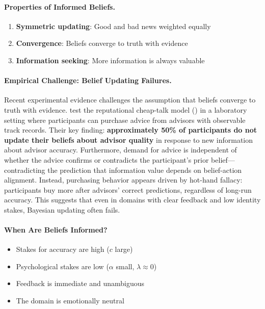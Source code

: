 \paragraph{Properties of Informed Beliefs.}
\begin{enumerate}
\item \textbf{Symmetric updating}: Good and bad news weighted equally
\item \textbf{Convergence}: Beliefs converge to truth with evidence
\item \textbf{Information seeking}: More information is always valuable
\end{enumerate}

\paragraph{Empirical Challenge: Belief Updating Failures.}
Recent experimental evidence challenges the assumption that beliefs converge to
truth with evidence. \citet{bregolin2026advice} test the reputational cheap-talk
model (\citealt{sobel1985theory}) in a laboratory setting where participants can
purchase advice from advisors with observable track records. Their key finding:
\textbf{approximately 50\% of participants do not update their beliefs about
advisor quality} in response to new information about advisor accuracy.
Furthermore, demand for advice is independent of whether the advice confirms or
contradicts the participant's prior belief---contradicting the prediction that
information value depends on belief-action alignment. Instead, purchasing behavior
appears driven by hot-hand fallacy: participants buy more after advisors' correct
predictions, regardless of long-run accuracy. This suggests that even in domains
with clear feedback and low identity stakes, Bayesian updating often fails.

\paragraph{When Are Beliefs Informed?}
\begin{itemize}
\item Stakes for accuracy are high ($c$ large)
\item Psychological stakes are low ($\alpha$ small, $\lambda \approx 0$)
\item Feedback is immediate and unambiguous
\item The domain is emotionally neutral
\end{itemize}

